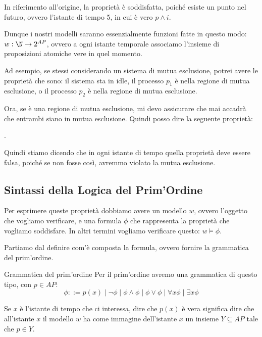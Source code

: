 In riferimento all'origine, la proprietà  è soddisfatta, poiché esiste un punto nel futuro, ovvero l'istante di tempo 5, in cui è vero \(p\land i\).

Dunque i nostri modelli saranno essenzialmente funzioni fatte in questo modo: \(w:\N \to 2^{AP}\), ovvero a ogni istante temporale associamo l'insieme di proposizioni atomiche vere in quel momento.


\begin{example}{}
  Ad esempio, se stessi considerando un sistema di mutua esclusione, potrei avere le proprietà che sono: il sistema sta in idle, il processo \(p_1\) è nella regione di mutua esclusione, o il processo \(p_2\) è nella regione di mutua esclusione.

  Ora, se è una regione di mutua esclusione, mi devo assicurare che mai accadrà che entrambi siano in mutua esclusione. Quindi posso dire la seguente proprietà:

  .

  Quindi stiamo dicendo che in ogni istante di tempo quella proprietà deve essere falsa, poiché se non fosse così, avremmo violato la mutua esclusione.
\end{example}


\subsection{Sintassi della Logica del Prim'Ordine}
Per esprimere queste proprietà dobbiamo avere un modello \(w\), ovvero l'oggetto che vogliamo verificare, e una formula \(\phi\) che rappresenta la proprietà che vogliamo soddisfare.
In altri termini vogliamo verificare questo: \(w \models \phi\).

Partiamo dal definire com'è composta la formula, ovvero fornire la grammatica del prim'ordine.

\begin{definition}{Grammatica del prim'ordine}
  Per il prim'ordine avremo una grammatica di questo tipo, con \(p \in AP\):
  \[\phi ::= p(x) \mid \neg \phi \mid \phi \land \phi \mid \phi \lor \phi\mid \forall x \phi \mid \exists x \phi\]
\end{definition}

Se \(x\) è l'istante di tempo che ci interessa, dire che \(p(x)\) è vera significa dire che all'istante \(x\) il modello \(w\) ha come immagine dell'istante \(x\) un insieme \(Y\subseteq AP\) tale che \(p\in Y\).

